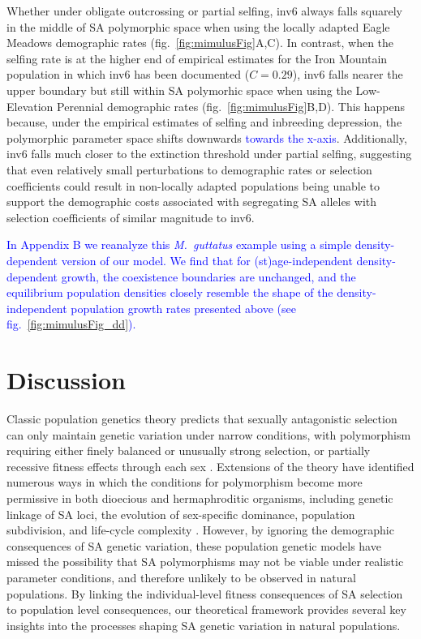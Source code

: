 \documentclass[11pt]{article}
\begin{document}
Whether under obligate outcrossing or partial selfing, inv6 always falls squarely in the middle of SA polymorphic space when using the locally adapted Eagle Meadows demographic rates (fig.~\ref{fig:mimulusFig}A,C). In contrast, when the selfing rate is at the higher end of empirical estimates for the Iron Mountain population in which inv6 has been documented ($C = 0.29$), inv6 falls nearer the upper boundary but still within SA polymorhic space when using the Low-Elevation Perennial demographic rates (fig.~\ref{fig:mimulusFig}B,D). This happens because, under the empirical estimates of selfing and inbreeding depression, the polymorphic parameter space shifts downwards \textcolor{blue}{towards the x-axis}. Additionally, inv6 falls much closer to the extinction threshold under partial selfing, suggesting that even relatively small perturbations to demographic rates or selection coefficients could result in non-locally adapted populations being unable to support the demographic costs associated with segregating SA alleles with selection coefficients of similar magnitude to inv6. 

\textcolor{blue}{In Appendix B we reanalyze this {\itshape M.~guttatus} example using a simple density-dependent version of our model. We find that for (st)age-independent density-dependent growth, the coexistence boundaries are unchanged, and the equilibrium population densities closely resemble the shape of the density-independent population growth rates presented above (see fig.~\ref{fig:mimulusFig_dd}). }


\section*{Discussion}

Classic population genetics theory predicts that sexually antagonistic selection can only maintain genetic variation under narrow conditions, with polymorphism requiring either finely balanced or unusually strong selection, or partially recessive fitness effects through each sex \citep{Kidwell1977,Pamilo1979,Prout2000, ConnallonClark2014}. Extensions of the theory have identified numerous ways in which the conditions for polymorphism become more permissive in both dioecious and hermaphroditic organisms, including genetic linkage of SA loci, the evolution of sex-specific dominance, population subdivision, and life-cycle complexity \citep[e.g.,][]{Patten2010,JordanConnallon2014,JordanCharlesworth2012,SpencerPriest2016, ConnallonSharmaOlito2019, Olito-etal-2018}. However, by ignoring the demographic consequences of SA genetic variation, these population genetic models have missed the possibility that SA polymorphisms may not be viable under realistic parameter conditions, and therefore unlikely to be observed in natural populations. By linking the individual-level fitness consequences of SA selection to population level consequences, our theoretical framework provides several key insights into the processes shaping SA genetic variation in natural populations.
\end{document}
